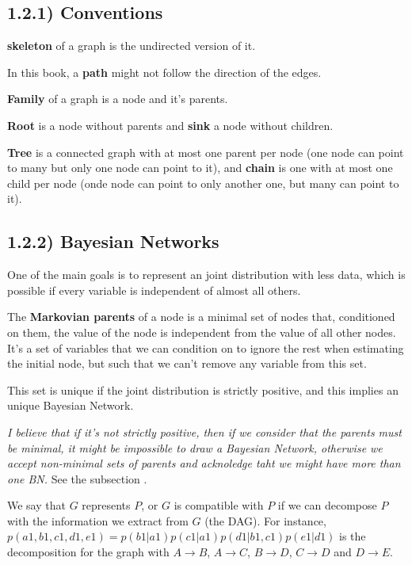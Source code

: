 \subsection{1.2.1) Conventions}

\textbf{skeleton} of a graph is the undirected version of it.

In this book, a \textbf{path} might not follow the direction of the edges.

\textbf{Family} of a graph is a node and it's parents.

\textbf{Root} is a node without parents and \textbf{sink} a node without children.

\textbf{Tree} is a connected graph with at most one parent per node (one node can point to many but only one node can point to it), and \textbf{chain} is one with at most one child per node (onde node can point to only another one, but many can point to it).


\subsection{1.2.2) Bayesian Networks}

One of the main goals is to represent an joint distribution with less data, which is possible if every variable is independent of almost all others.

The \textbf{Markovian parents} of a node is a minimal set of nodes that, conditioned on them, the value of the node is independent from the value of all other nodes. It's a set of variables that we can condition on to ignore the rest when estimating the initial node, but such that we can't remove any variable from this set.

This set is unique if the joint distribution is strictly positive, and this implies an unique Bayesian Network. 


\textit{I believe that if it's not strictly positive, then if we consider that the parents must be minimal, it might be impossible to draw a Bayesian Network, otherwise we accept non-minimal sets of parents and acknoledge taht we might have more than one BN.} See the subsection .


We say that $G$ represents $P$, or $G$ is compatible with $P$ if we can decompose $P$ with the information we extract from $G$ (the DAG). For instance, $p(a1,b1,c1,d1,e1) = p(b1|a1)p(c1|a1)p(d1|b1,c1)p(e1|d1)$ is the decomposition for the graph with $A\rightarrow B$, $A\rightarrow C$, $B\rightarrow D$, $C \rightarrow D$ and $D\rightarrow E$.


